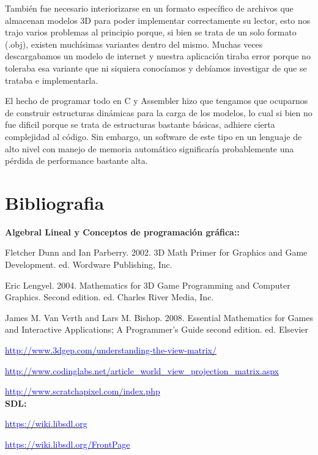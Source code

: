 \documentclass[a4paper]{article}
\newcounter{col}
\begin{document}
También fue necesario interiorizarse en un formato específico de archivos que almacenan modelos 3D para poder implementar correctamente su lector, esto nos trajo varios problemas al principio porque, si bien se trata de un solo formato (.obj), existen muchísimas variantes dentro del mismo. Muchas veces descargabamos un modelo de internet y nuestra aplicación tiraba error porque no toleraba esa variante que ni siquiera conocíamos y debíamos investigar de que se trataba e implementarla.

El hecho de programar todo en C y Assembler hizo que tengamos que ocuparnos de construir estructuras dinámicas para la carga de los modelos, lo cual si bien no fue dificil porque se trata de estructuras bastante básicas, adhiere cierta complejidad al código. Sin embargo, un software de este tipo en un lenguaje de alto nivel con manejo de memoria automático significaría probablemente una pérdida de performance bastante alta.


\section{Bibliografia}


\textbf{Algebral Lineal y Conceptos de programación gráfica::}

Fletcher Dunn and Ian Parberry. 2002. 3D Math Primer for Graphics and Game Development. ed. Wordware Publishing, Inc.

Eric Lengyel. 2004. Mathematics for 3D Game Programming and Computer Graphics. Second edition.  ed. Charles River Media, Inc. 

James M. Van Verth and Lars M. Bishop. 2008. Essential Mathematics for Games and Interactive Applications; A Programmer’s Guide second edition. ed. Elsevier

\href{http://www.3dgep.com/understanding-the-view-matrix/}{\textcolor{blue}{http://www.3dgep.com/understanding-the-view-matrix/}}

\href{http://www.codinglabs.net/article_world_view_projection_matrix.aspx}{\textcolor{blue}{http://www.codinglabs.net/article_world_view_projection_matrix.aspx}}

\href{http://www.scratchapixel.com/index.php}{\textcolor{blue}{http://www.scratchapixel.com/index.php}}\\

\textbf{SDL:}

\href{https://wiki.libsdl.org}{\textcolor{blue}{https://wiki.libsdl.org}}

\href{https://wiki.libsdl.org/FrontPage}{\textcolor{blue}{https://wiki.libsdl.org/FrontPage}}\\
\end{document}
